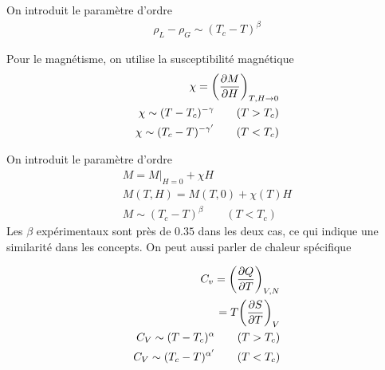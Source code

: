 On introduit le paramètre d'ordre
\begin{align}
    \rho_L-\rho_G\sim(T_c-T)^\beta
\end{align}

Pour le magnétisme, on utilise la susceptibilité magnétique
\begin{align}
    \chi=\qty(\pdv{M}{H})_{T,H\rightarrow0}\\
    \chi\sim (T-T_c)^{-\gamma}\qquad(T>T_c)\\
    \chi\sim (T_c-T)^{-\gamma'}\qquad(T<T_c)
\end{align}

On introduit le paramètre d'ordre
\begin{align}
    M=M|_{H=0}+\chi H\\
    M(T,H)=M(T,0)+\chi(T)H\\
    M\sim (T_c-T)^\beta\qquad(T<T_c)
\end{align}
Les $\beta$ expérimentaux sont près de $0.35$ dans les deux cas, ce qui indique
une similarité dans les concepts. On peut aussi parler de chaleur spécifique

\begin{align}
    C_v=\qty(\pdv{Q}{T})_{V,N}\\
    =T\qty(\pdv{S}{T}­)_V\\
    C_V\sim(T-T_c)^\alpha\qquad(T>T_c)\\
    C_V\sim(T_c-T)^{\alpha'}\qquad(T<T_c)\\
\end{align}

